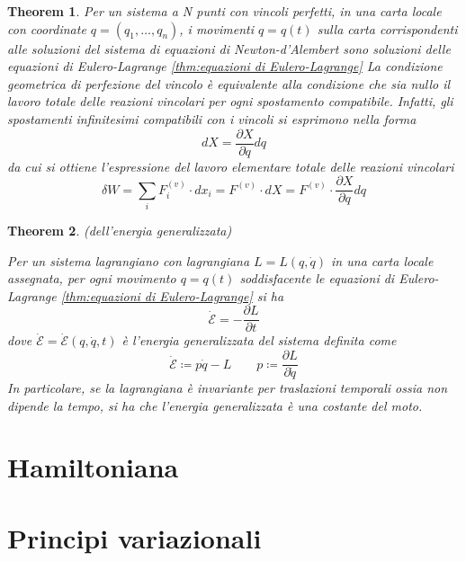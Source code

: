 \documentclass{article}
\newtheorem{theorem}{Theorem}[section]
\begin{document}
            \begin{theorem}
                
                Per un sistema a N punti con vincoli perfetti, in una carta locale con coordinate $q = (q_1, \dots, q_n)$, i movimenti $q = q(t)$ sulla carta corrispondenti
                alle soluzioni del sistema di equazioni di Newton-d'Alembert sono soluzioni delle equazioni di Eulero-Lagrange \ref{thm:equazioni di Eulero-Lagrange}
                La condizione geometrica di perfezione del vincolo è equivalente alla condizione che sia nullo il lavoro totale delle reazioni vincolari per ogni spostamento compatibile.
                Infatti, gli spostamenti infinitesimi compatibili con i vincoli si esprimono nella forma \[ dX = \frac{\partial X}{\partial q} dq \] da cui si ottiene l'espressione 
                del lavoro elementare totale delle reazioni vincolari \[ \delta W = \sum_i F_i^{(v)} \cdot dx_i = F^{(v)} \cdot dX = F^{(v)} \cdot \frac{\partial X}{\partial q} dq \]
            \end{theorem}

            \begin{theorem}(dell'energia generalizzata)
                \label{thm:di Jacobi}

                Per un sistema lagrangiano con lagrangiana $L = L(q, \dot{q})$ in una carta locale assegnata, per ogni movimento $q = q(t)$ soddisfacente le equazioni di Eulero-Lagrange \ref{thm:equazioni di Eulero-Lagrange}
                si ha \[ \dot{\mathcal{E}} = - \frac{\partial L}{\partial t} \] dove $\dot{\mathcal{E}} = \dot{\mathcal{E}}(q, \dot{q}, t)$ è l'energia generalizzata del sistema definita come 
                \[ \dot{\mathcal{E}} \coloneqq p\dot{q} - L \quad \quad p \coloneqq \frac{\partial L}{\partial \dot{q}} \]
                In particolare, se la lagrangiana è invariante per traslazioni temporali ossia non dipende la tempo, si ha che l'energia generalizzata è una costante del moto.  

            \end{theorem}

            

    \clearpage
    \section{Hamiltoniana}

    \clearpage
    \section{Principi variazionali}
\end{document}
